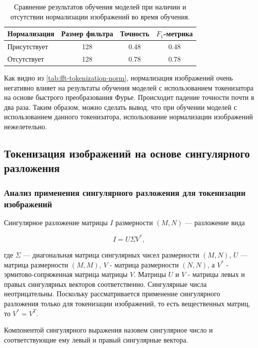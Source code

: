 \begin{table}[H]
  \centering
  \begin{tabular}{|l|c|c|c|}
    \hline
    Нормализация & Размер фильтра & Точность & $F_1$-метрика \\ \hline
    Присутствует & 128 & 0.48 & 0.48 \\
    Отсутствует & 128 & 0.78 & 0.78 \\
    \hline
  \end{tabular}

    \caption{Сравнение результатов обучения моделей при наличии и отсутствии нормализации изображений во время обучения.}
  \label{tab:fft-tokenization-norm}
\end{table}

Как видно из \autoref{tab:fft-tokenization-norm}, нормализация изображений очень негативно влияет на результаты обучения моделей с использованием токенизатора на основе быстрого преобразования Фурье. Происходит падение точности почти в два раза. Таким образом, можно сделать вывод, что при обучении моделей с использованием данного токенизатора, использование нормализации изображений нежелетельно.

\subsection{Токенизация изображений на основе сингулярного разложения}

\subsubsection{Анализ применения сингулярного разложения для токенизации изображений}

Сингулярное разложение \cite{loginov_svd} матрицы $I$ размерности $(M, N)$ --- разложение вида 

$$
I = U\Sigma V^*,
$$

где $\Sigma$ --- диагональная матрица сингулярных чисел размерности $(M, N)$, $U$ --- матрица размерности $(M, M)$, $V$ - матрица размерности $(N, N)$, а $V^*$ - эрмитово-сопряженная матрица матрицы $V$. Матрицы $U$ и $V$ - матрицы левых и правых сингулярных векторов соответственно. Сингулярные числа неотрицательны. Поскольку рассматривается применение сингулярного разложения только для токенизации изображений, то есть вещественных матриц, то $V^* = V^T$.

Компонентой сингулярного выражения назовем сингулярное число и соответствующие ему левый и правый сингулярные вектора.

